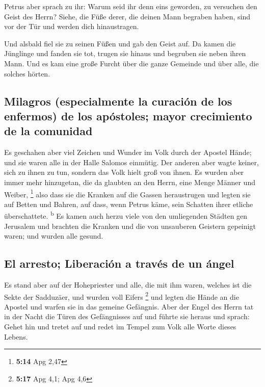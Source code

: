  Petrus aber sprach zu ihr: Warum seid ihr denn eins
geworden, zu versuchen den Geist des Herrn? Siehe, die Füße derer, die
deinen Mann begraben haben, sind vor der Tür und werden dich
hinaustragen.

 Und alsbald fiel sie zu seinen Füßen und gab den Geist
auf. Da kamen die Jünglinge und fanden sie tot, trugen sie hinaus und
begruben sie neben ihren Mann.  Und es kam eine große
Furcht über die ganze Gemeinde und über alle, die solches hörten.

\hypertarget{milagros-especialmente-la-curaciuxf3n-de-los-enfermos-de-los-apuxf3stoles-mayor-crecimiento-de-la-comunidad}{%
\subsection{Milagros (especialmente la curación de los enfermos) de los
apóstoles; mayor crecimiento de la
comunidad}\label{milagros-especialmente-la-curaciuxf3n-de-los-enfermos-de-los-apuxf3stoles-mayor-crecimiento-de-la-comunidad}}

 Es geschahen aber viel Zeichen und Wunder im Volk durch
der Apostel Hände; und sie waren alle in der Halle Salomos einmütig.
 Der anderen aber wagte keiner, sich zu ihnen zu tun,
sondern das Volk hielt groß von ihnen.  Es wurden aber
immer mehr hinzugetan, die da glaubten an den Herrn, eine Menge Männer
und Weiber, \footnote{\textbf{5:14} Apg 2,47}  also dass
sie die Kranken auf die Gassen heraustrugen und legten sie auf Betten
und Bahren, auf dass, wenn Petrus käme, sein Schatten ihrer etliche
überschattete. \textsuperscript{b}  Es kamen auch herzu
viele von den umliegenden Städten gen Jerusalem und brachten die Kranken
und die von unsauberen Geistern gepeinigt waren; und wurden alle gesund.

\hypertarget{el-arresto-liberaciuxf3n-a-travuxe9s-de-un-uxe1ngel}{%
\subsection{El arresto; Liberación a través de un
ángel}\label{el-arresto-liberaciuxf3n-a-travuxe9s-de-un-uxe1ngel}}

 Es stand aber auf der Hohepriester und alle, die mit ihm
waren, welches ist die Sekte der Sadduzäer, und wurden voll Eifers
\footnote{\textbf{5:17} Apg 4,1; Apg 4,6}  und legten die
Hände an die Apostel und warfen sie in das gemeine Gefängnis.
 Aber der Engel des Herrn tat in der Nacht die Türen des
Gefängnisses auf und führte sie heraus und sprach:  Gehet
hin und tretet auf und redet im Tempel zum Volk alle Worte dieses
Lebens.

